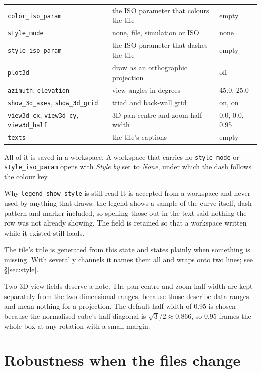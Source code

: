 \documentclass[11pt,a4paper,oneside]{report}
\newcommand{\code}[1]{\texttt{#1}}
\begin{document}
\begin{center}
\begin{longtable}{@{}p{}p{}p{}@{}}
\code{color\_iso\_param} & the ISO parameter that colours the tile & empty \\
\code{style\_mode} & none, file, simulation or ISO & none \\
\code{style\_iso\_param} & the ISO parameter that dashes the tile & empty \\
\code{plot3d} & draw as an orthographic projection & off \\
\code{azimuth}, \code{elevation} & view angles in degrees & 45.0, 25.0 \\
\code{show\_3d\_axes}, \code{show\_3d\_grid} & triad and back-wall grid & on, on \\
\code{view3d\_cx}, \code{view3d\_cy}, \code{view3d\_half} & 3D pan centre and zoom half-width & 0.0, 0.0, 0.95 \\
\code{texts} & the tile's captions & empty \\
\bottomrule
\end{longtable}
\end{center}

All of it is saved in a workspace. A workspace that carries no
\code{style\_mode} or \code{style\_iso\_param} opens with \emph{Style by} set
to \emph{None}, under which the dash follows the colour key.

\begin{aoenote}{Why \code{legend\_show\_style} is still read}
It is accepted from a workspace and never used by anything that draws: the
legend shows a sample of the curve itself, dash pattern
and marker included, so spelling those out in the text said nothing the row was
not already showing. The field is retained so that a workspace written while it
existed still loads.
\end{aoenote}

The tile's title is generated from this state and states plainly when something
is missing. With several y channels it names them all and wraps onto two lines;
see \S\ref{sec:style}.

Two 3D view fields deserve a note. The pan centre and zoom half-width are kept
separately from the two-dimensional ranges, because those describe data ranges
and mean nothing for a projection. The default half-width of 0.95 is chosen
because the normalised cube's half-diagonal is $\sqrt{3}/2 \approx 0.866$, so
0.95 frames the whole box at any rotation with a small margin.

\section{Robustness when the files change}
\label{sec:swap}
\end{document}
